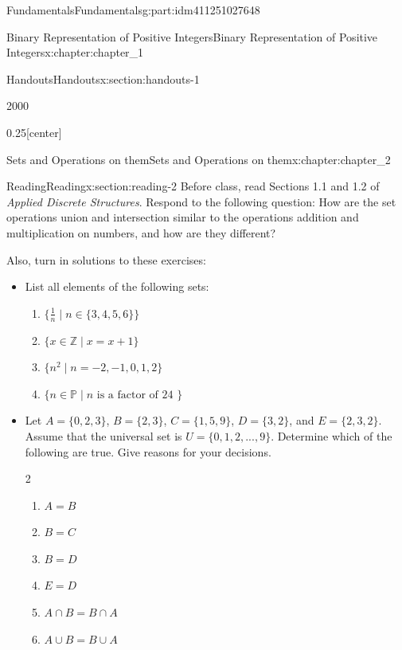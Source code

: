 \documentclass[oneside,10pt,]{book}
\numberwithin{equation}{section}
\begin{document}
\begin{partptx}{Fundamentals}{}{Fundamentals}{}{}{g:part:idm411251027648}
\begin{chapterptx}{Binary Representation of Positive Integers}{}{Binary Representation of Positive Integers}{}{}{x:chapter:chapter_1}
\begin{sectionptx}{Handouts}{}{Handouts}{}{}{x:section:handouts-1}
\begin{sidebyside}{2}{0}{0}{0}
\begin{sbspanel}{0.25}[center]
%
\end{sbspanel}%
\end{sidebyside}%
\end{sectionptx}
\end{chapterptx}
%
\typeout{************************************************}
\typeout{************************************************}
%
\begin{chapterptx}{Sets and Operations on them}{}{Sets and Operations on them}{}{}{x:chapter:chapter_2}
%
%
%
\typeout{************************************************}
\typeout{************************************************}
%
\begin{sectionptx}{Reading}{}{Reading}{}{}{x:section:reading-2}
Before class, read Sections 1.1 and 1.2 of \emph{Applied Discrete Structures}.  Respond to the following question: How are the set operations union and intersection similar to the operations addition and multiplication on numbers, and how are they different?%
\par
Also, turn in solutions to these exercises:%
\begin{itemize}[label=\textbullet]
\item{}List all elements of the following sets:%
\begin{enumerate}[label=(\alph*)]
\item{}\(\{\frac{1}{n} \mid n \in \{3,4,5,6\}\}\)%
\item{}\(\{x \in \mathbb{Z} \mid x = x+1 \}\)%
\item{}\(\{n^2 \mid  n = -2, -1, 0, 1, 2\}\)%
\item{}\(\{n \in  \mathbb{P} \mid n \textrm{ is a  factor of  24 }\}\)%
\end{enumerate}
%
\item{}Let \(A = \{0, 2, 3\}\), \(B = \{2, 3\}\), \(C = \{1, 5, 9\}\), \(D = \{3, 2\}\), and \(E = \{2, 3, 2\}\). Assume that the universal set is \(U = \{0, 1, 2, . . . , 9\}\). Determine which of the following are true. Give reasons for your decisions.%
\begin{multicols}{2}
\begin{enumerate}[label=(\alph*)]
\item{}\(A = B\)%
\item{}\(B = C\)%
\item{}\(B = D\)%
\item{}\(E=D\)%
\item{}\(A\cap B = B\cap A\)%
\item{}\(A \cup  B = B \cup  A\)%

\end{enumerate}
\end{multicols}
\end{itemize}
\end{sectionptx}
\end{chapterptx}
\end{partptx}
\end{document}
